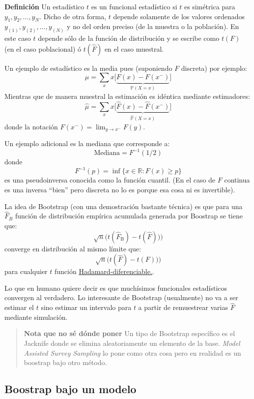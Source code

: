 \documentclass[
]{book}
\begin{document}
\textbf{Definición}
Un estadístico \(t\) es un funcional estadístico si \(t\) es simétrica para \(y_1, y_2, \dots, y_N\). Dicho de otra forma, \(t\) depende solamente de los valores ordenados \(y_{(1)}, y_{(2)}, \dots, y_{(N)}\) y no del orden preciso (de la muestra o la población). En este caso \(t\) depende sólo de la función de distribución y se escribe como \(t(F)\) (en el caso poblacional) ó \(t(\hat{F})\) en el caso muestral.

Un ejemplo de estadístico es la media pues (suponiendo \(F\) discreta) por ejemplo:
\[
\mu = \sum\limits_x x\big[\underbrace{F(x) - F(x^-)}_{\mathbb{P}(X = x)}\big]
\]
Mientras que de manera muestral la estimación es idéntica mediante estimadores:
\[
\hat{\mu} = \sum\limits_x x\big[\underbrace{\hat{F}(x) - \hat{F}(x^-)}_{\hat{\mathbb{P}}(X = x)}\big]
\]
donde la notación \(F(x^-) = \lim_{y \to x^-} F(y)\).

Un ejemplo adicional es la mediana que corresponde a:
\[
\textrm{Mediana} = F^{-1}(1/2)
\]
donde
\[
F^{-1}(p) = \inf \{ x \in \mathbb{R} : F(x) \geq p\}
\]
es una pseudoinversa conocida como la función cuantil. (En el caso de \(F\) continua es una inversa ``bien'' pero discreta no lo es porque esa cosa ni es invertible).

La idea de Bootstrap (con una demostración bastante técnica) es que para una \(\hat{F}_B\) función de distribución empírica acumulada generada por Boostrap se tiene que:
\[
\sqrt{n} \big( t(\hat{F}_{\text{B}}) - t(\hat{F})))
\]
converge en distribución al mismo límite que:
\[
\sqrt{n} \big( t(\hat{F}) - t(F)))
\]
para cualquier \(t\) función \href{https://en.wikipedia.org/wiki/Hadamard_derivative}{Hadamard-diferenciable.}.

Lo que en humano quiere decir es que muchísimos funcionales estadísticos convergen al verdadero. Lo interesante de Bootstrap (usualmente) no va a ser estimar el \(t\) sino estimar un intervalo para \(t\) a partir de remuestrear varias \(\hat{F}\) mediante simulación.

\begin{quote}
\textbf{Nota que no sé dónde poner} Un tipo de Bootstrap específico es el Jacknife donde se elimina aleatoriamente un elemento de la base. \emph{Model Assisted Survey Sampling} lo pone como otra cosa pero en realidad es un boostrap bajo otro método.
\end{quote}

\hypertarget{boostrap-bajo-un-modelo}{%
\subsection{Boostrap bajo un modelo}\label{boostrap-bajo-un-modelo}}
\end{document}
